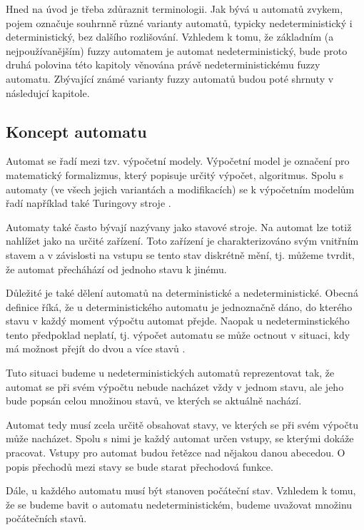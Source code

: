 Hned na úvod je třeba zdůraznit terminologii. Jak bývá u automatů zvykem, pojem  označuje souhrnně různé varianty automatů, typicky nedeterministický i deterministický, bez dalšího rozlišování. Vzhledem k tomu, že základním (a nejpoužívanějším) fuzzy automatem je automat nedeterministický, bude proto druhá polovina této kapitoly věnována právě nedeterministickému fuzzy automatu. Zbývající známé varianty fuzzy automatů budou poté shrnuty v následujcí kapitole.


\subsection{Koncept automatu}
Automat se řadí mezi tzv. výpočetní modely. Výpočetní model je označení pro matematický formalizmus, který popisuje určitý výpočet, algoritmus. Spolu s automaty (ve všech jejich variantách a modifikacích) se k výpočetním modelům řadí například také Turingovy stroje \cite{MorMal-FuzzyAutLang}. 

Automaty také často bývají nazývany jako stavové stroje. Na automat lze totiž nahlížet jako na určité zařízení. Toto zařízení je charakterizováno svým vnitřním stavem a v závislosti na vstupu se tento stav diskrétně mění, tj. můžeme tvrdit, že automat přecháhází od jednoho stavu k jinému.

Důležité je také dělení automatů na deterministické a nedeterministické. Obecná definice říká, že u deterministického automatu je jednoznačně dáno, do kterého stavu v každý moment výpočtu automat přejde. Naopak u nedeterminstického tento předpoklad neplatí, tj. výpočet automatu se může octnout v situaci, kdy má možnost přejít do dvou a více stavů .

Tuto situaci budeme u nedeterministických automatů reprezentovat tak, že automat se při svém výpočtu nebude nacházet vždy v jednom stavu, ale jeho  bude popsán celou množinou stavů, ve kterých se aktuálně nachází.

Automat tedy musí zcela určitě obsahovat stavy, ve kterých se při svém výpočtu může nacházet. Spolu s nimi je každý automat určen vstupy, se kterými dokáže pracovat. Vstupy pro automat budou řetězce nad nějakou danou abecedou. O popis přechodů mezi stavy se bude starat přechodová funkce.

Dále, u každého automatu musí být stanoven počáteční stav. Vzhledem k tomu, že se budeme bavit o automatu nedeterministickém, budeme uvažovat množinu počátečních stavů.

